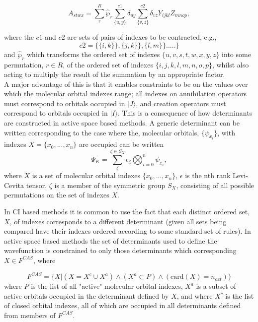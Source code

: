 \documentclass[12pt]{article}
\begin{document}
\begin{equation*}
A_{stwx} = \sum_{r}^{R}\hat{\wp}_{r}\sum^{c1}_{\{u,y\}}\delta_{uy}\sum^{c2}_{\{v,z\}} \delta_{vz}Y_{ijkl}Z_{mnop},
\end{equation*}

where the $c1$ and $c2$ are sets of pairs of indexes to be contracted, e.g.,
\begin{equation}
c2 = \{ \{i, k\} \} , \{j, k\} \} ,\{l, m\} \}.....\} 
\end{equation}
and $\hat{\wp}_{r}$ which transforms the ordered set of indexes
$\{u,v,s,t,w,x,y,z\}$ into some permutation, $r\in R$, of the ordered set of
indexes $\{i,j,k,l,m,n,o,p\}$, whilst also acting to multiply the result of the
summation by an appropriate factor.\\

\noindent A major advantage of this is that it enables constraints to be
on the values over which the molecular orbital indexes range; all indexes on 
annihilation operators must correspond to orbitals occupied in $|J\rangle$, and 
creation operators must correspond to orbitals occupied in $|I\rangle$. 
This is a consequence of how determinants are constructed in 
active space based methods. A generic determinant can be written 
corresponding to the case where the, molecular orbitals, $\{\psi_{x_{i}}\}$,
with indexes  $X = \{x_{0},...,x_{n}\}$ are occupied can be written
\begin{equation}
\Psi_{K} = \sum^{\zeta \in S_{X}}_{\zeta} \epsilon_{\zeta} \bigotimes_{i=0}^{n}  \psi_{x_{i}},
\end{equation}
where $X$ is a set of molecular orbital indexes $\{x_{0},...,x_{n}\}$,
$\epsilon$ is the nth rank Levi-Cevita
tensor, $\zeta$ is a member of the symmetric group $S_{X}$,
consisting of all possible permutations on the set of indexes $X$.

\noindent In CI based methods it is common to use the fact that 
each distinct ordered set, $X$, of indexes corresponds to a different 
determinant (given all sets being compared have their indexes ordered according
to some standard set of rules). In active space based methods the set of
determinants used to define the wavefunction is constrained to only
those determinants which corresponding $X \in {F^{CAS}}$, where

\begin{equation*}
F^{CAS} = \{ X | (X = X^{c} \cup X^{a}) \wedge (X^{a} \subset P) \wedge ( \text{card}(X) = n_{act} )  \}
\end{equation*}
where $P$ is the list of all "active" molecular orbital indexes, 
$X^{a}$ is a subset of active orbitals occupied in the determinant defined by $X$, and
where $X^{c}$ is the list of closed orbital indexes, all of which are occupied in all determinants defined
from members of $F^{CAS}$.\\
\end{document}
